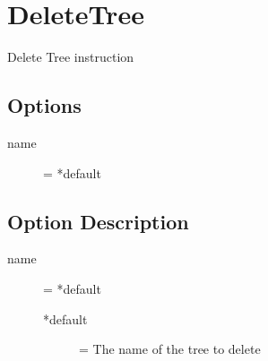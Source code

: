 \section{DeleteTree}

Delete Tree instruction

\subsection{Options}
\begin{description}
\item[name] = *default
\end{description}

\subsection{Option Description}
\begin{description}
\item[name] = *default
	\begin{description}
	\item[*default] = The name of the tree to delete 
	\end{description}
	
\end{description} 